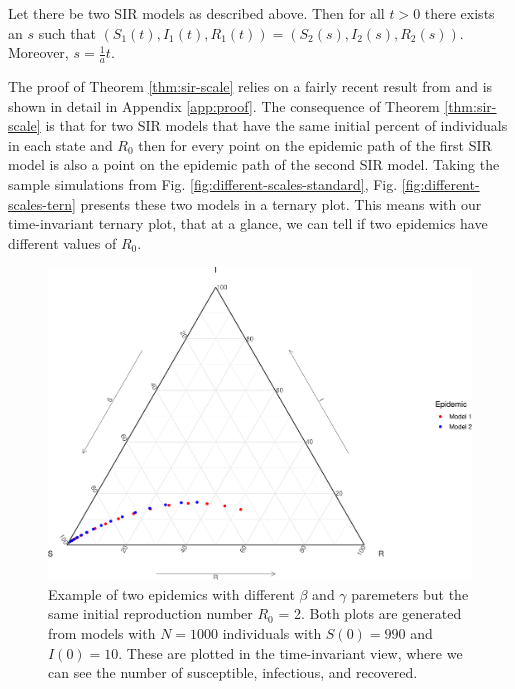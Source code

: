 \documentclass[
  shortnames]{jss}
\begin{document}
\begin{theorem}\label{thm:sir-scale}
Let there be two SIR models as described above.  Then for all $t > 0$ there exists an $s$ such that $(S_1(t), I_1(t), R_1(t)) = (S_2(s), I_2(s), R_2(s))$.  Moreover, $s = \frac{1}{a}t$.
\end{theorem}

The proof of Theorem \ref{thm:sir-scale} relies on a fairly recent
result from \cite{Harko2014} and is shown in detail in Appendix
\ref{app:proof}. The consequence of Theorem \ref{thm:sir-scale} is that
for two SIR models that have the same initial percent of individuals in
each state and \(R_0\) then for every point on the epidemic path of the
first SIR model is also a point on the epidemic path of the second SIR
model. Taking the sample simulations from Fig.
\ref{fig:different-scales-standard}, Fig.
\ref{fig:different-scales-tern} presents these two models in a ternary
plot. This means with our time-invariant ternary plot, that at a glance,
we can tell if two epidemics have different values of \(R_0\).

\begin{CodeChunk}
\begin{figure}[H]

{\centering \includegraphics{Figs/unnamed-chunk-3-1} 

}

\caption{\label{fig:different-scales-tern}Example of two epidemics with different $\beta$ and $\gamma$ paremeters but the same initial reproduction number $R_0$ = 2.  Both plots are generated from models with $N= 1000$ individuals with $S(0) = 990$ and $I(0) = 10$.  These are plotted in the time-invariant view, where we can see the number of susceptible, infectious, and recovered.}\label{fig:unnamed-chunk-3}
\end{figure}
\end{CodeChunk}
\end{document}
